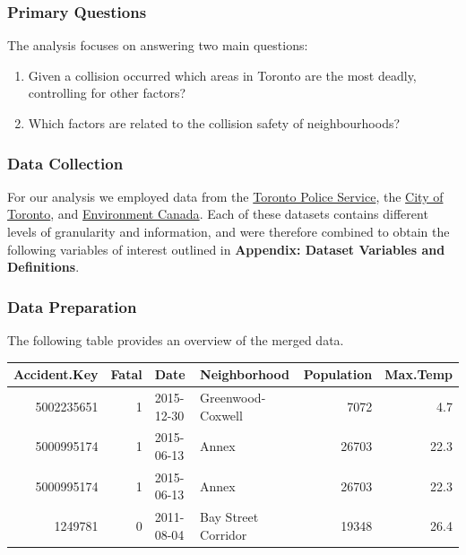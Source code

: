\documentclass[]{article}
\providecommand{\tightlist}{%
  \setlength{\itemsep}{0pt}\setlength{\parskip}{0pt}}
\begin{document}
\subsubsection{Primary Questions}\label{primary-questions}

The analysis focuses on answering two main questions:

\begin{enumerate}
\def\labelenumi{\arabic{enumi}.}
\tightlist
\item
  Given a collision occurred which areas in Toronto are the most deadly,
  controlling for other factors?
\item
  Which factors are related to the collision safety of neighbourhoods?
\end{enumerate}

\subsubsection{Data Collection}\label{data-collection}

For our analysis we employed data from the
\href{http://data.torontopolice.on.ca}{Toronto Police Service}, the
\href{https://www.toronto.ca/city-government/data-research-maps}{City of
Toronto}, and
\href{http://climate.weather.gc.ca/historical_data/search_historic_data_e.html}{Environment
Canada}. Each of these datasets contains different levels of granularity
and information, and were therefore combined to obtain the following
variables of interest outlined in \textbf{Appendix: Dataset Variables
and Definitions}.

\subsubsection{Data Preparation}\label{data-preparation}

The following table provides an overview of the merged data.

\begin{table}[H]
\centering
\begin{tabular}{r|r|l|l|r|r}
\hline
Accident.Key & Fatal & Date & Neighborhood & Population & Max.Temp\\
\hline
5002235651 & 1 & 2015-12-30 & Greenwood-Coxwell & 7072 & 4.7\\
\hline
5000995174 & 1 & 2015-06-13 & Annex & 26703 & 22.3\\
\hline
5000995174 & 1 & 2015-06-13 & Annex & 26703 & 22.3\\
\hline
1249781 & 0 & 2011-08-04 & Bay Street Corridor & 19348 & 26.4\\
\hline
\end{tabular}
\end{table}
\end{document}
